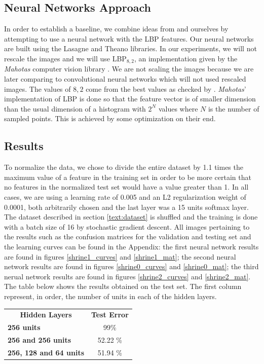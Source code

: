 \begin{multicols}{2}
\section{Neural Networks Approach}
In order to establish a baseline, we combine ideas from \citet{kylberg2011virus} and ourselves by attempting to use a neural network with the LBP features. Our neural networks are built using the Lasagne and Theano \cite{Bastien-Theano-2012, bergstra+al:2010-scipy} libraries. In our experiments, we will not rescale the images and we will use LBP$_{8,2}$, an implementation given by the \emph{Mahotas} computer vision library \citet{coelho2012mahotas}. We are not scaling the images because we are later comparing to convolutional neural networks which will not used rescaled images. The values of $8,2$ come from the best values as checked by \citet{kylberg2011virus}. \emph{Mahotas}' implementation of LBP is done so that the feature vector is of smaller dimension than the usual dimension of a histogram with $2^N$ values where $N$ is the number of sampled points. This is achieved by some optimization on their end. 
\subsection{Results}
To normalize the data, we chose to divide the entire dataset by 1.1 times the maximum value of a feature in the training set in order to be more certain that no features in the normalized test set would have a value greater than 1. In all cases, we are using a learning rate of 0.005 and an L2 regularization weight of 0.0001, both arbitrarily chosen and the last layer was a 15 units softmax layer. The dataset described in section \ref{text:dataset} is shuffled and the training is done with a batch size of 16 by stochastic gradient descent. All images pertaining to the results such as the confusion matrices for the validation and testing set and the learning curves can be found in the Appendix: the first neural network results are found in figures \ref{shrine1_curves} and \ref{shrine1_mat}; the second neural network results are found in figures \ref{shrine0_curves} and \ref{shrine0_mat}; the third nerual network results are found in figures \ref{shrine2_curves} and \ref{shrine2_mat}. The table below shows the results obtained on the test set. The first column represent, in order, the number of units in each of the hidden layers. 

\begin{tabular}{lc}
\multicolumn{1}{c}{\textbf{Hidden Layers}} & \textbf{Test Error} \\
\textbf{256 units}                         &         99\%            \\
\textbf{256 and 256 units}                 &   52.22 \%                \\
\textbf{256, 128 and 64 units}             &   51.94 \%                 
\end{tabular}


\end{multicols}

